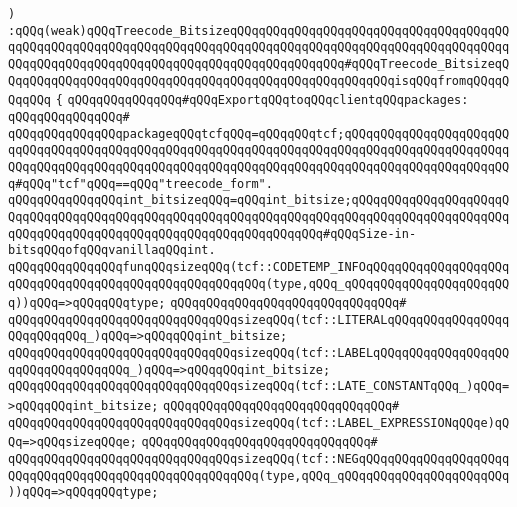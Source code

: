 \verb|)|\newline
\verb|:qQQq(weak)qQQqTreecode_BitsizeqQQqqQQqqQQqqQQqqQQqqQQqqQQqqQQqqQQqqQQqqQQqqQQqqQQqqQQqqQQqqQQqqQQqqQQqqQQqqQQqqQQqqQQqqQQqqQQqqQQqqQQqqQQqqQQqqQQqqQQqqQQqqQQqqQQqqQQqqQQqqQQqqQQqqQQqqQQq#qQQqTreecode_BitsizeqQQqqQQqqQQqqQQqqQQqqQQqqQQqqQQqqQQqqQQqqQQqqQQqqQQqqQQqisqQQqfromqQQqqQQqqQQq|\newline
\verb|{|\newline
\verb|qQQqqQQqqQQqqQQq#qQQqExportqQQqtoqQQqclientqQQqpackages:|\newline
\verb|qQQqqQQqqQQqqQQq#|\newline
\verb|qQQqqQQqqQQqqQQqpackageqQQqtcfqQQq=qQQqqQQqtcf;qQQqqQQqqQQqqQQqqQQqqQQqqQQqqQQqqQQqqQQqqQQqqQQqqQQqqQQqqQQqqQQqqQQqqQQqqQQqqQQqqQQqqQQqqQQqqQQqqQQqqQQqqQQqqQQqqQQqqQQqqQQqqQQqqQQqqQQqqQQqqQQqqQQqqQQqqQQqqQQqqQQq#qQQq"tcf"qQQq==qQQq"treecode_form".|\newline
\newline
\verb|qQQqqQQqqQQqqQQqint_bitsizeqQQq=qQQqint_bitsize;qQQqqQQqqQQqqQQqqQQqqQQqqQQqqQQqqQQqqQQqqQQqqQQqqQQqqQQqqQQqqQQqqQQqqQQqqQQqqQQqqQQqqQQqqQQqqQQqqQQqqQQqqQQqqQQqqQQqqQQqqQQqqQQqqQQqqQQq#qQQqSize-in-bitsqQQqofqQQqvanillaqQQqint.|\newline
\newline
\verb|qQQqqQQqqQQqqQQqfunqQQqsizeqQQq(tcf::CODETEMP_INFOqQQqqQQqqQQqqQQqqQQqqQQqqQQqqQQqqQQqqQQqqQQqqQQqqQQqqQQq(type,qQQq_qQQqqQQqqQQqqQQqqQQqqQQq))qQQq=>qQQqqQQqtype;|\newline
\verb|qQQqqQQqqQQqqQQqqQQqqQQqqQQqqQQq#|\newline
\verb|qQQqqQQqqQQqqQQqqQQqqQQqqQQqqQQqsizeqQQq(tcf::LITERALqQQqqQQqqQQqqQQqqQQqqQQqqQQq_)qQQq=>qQQqqQQqint_bitsize;|\newline
\verb|qQQqqQQqqQQqqQQqqQQqqQQqqQQqqQQqsizeqQQq(tcf::LABELqQQqqQQqqQQqqQQqqQQqqQQqqQQqqQQqqQQq_)qQQq=>qQQqqQQqint_bitsize;|\newline
\verb|qQQqqQQqqQQqqQQqqQQqqQQqqQQqqQQqsizeqQQq(tcf::LATE_CONSTANTqQQq_)qQQq=>qQQqqQQqint_bitsize;|\newline
\verb|qQQqqQQqqQQqqQQqqQQqqQQqqQQqqQQq#|\newline
\verb|qQQqqQQqqQQqqQQqqQQqqQQqqQQqqQQqsizeqQQq(tcf::LABEL_EXPRESSIONqQQqe)qQQq=>qQQqsizeqQQqe;|\newline
\verb|qQQqqQQqqQQqqQQqqQQqqQQqqQQqqQQq#|\newline
\verb|qQQqqQQqqQQqqQQqqQQqqQQqqQQqqQQqsizeqQQq(tcf::NEGqQQqqQQqqQQqqQQqqQQqqQQqqQQqqQQqqQQqqQQqqQQqqQQqqQQqqQQq(type,qQQq_qQQqqQQqqQQqqQQqqQQqqQQq))qQQq=>qQQqqQQqtype;|\newline
